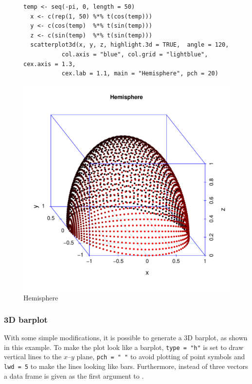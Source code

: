 \vspace*{10mm}
\begin{figure}[htb!]
\small
\begin{Verbatim}[frame=single]
  temp <- seq(-pi, 0, length = 50)
  x <- c(rep(1, 50) %*% t(cos(temp)))
  y <- c(cos(temp)  %*% t(sin(temp)))
  z <- c(sin(temp)  %*% t(sin(temp)))
  scatterplot3d(x, y, z, highlight.3d = TRUE,  angle = 120,
           col.axis = "blue", col.grid = "lightblue", cex.axis = 1.3,
           cex.lab = 1.1, main = "Hemisphere", pch = 20)
\end{Verbatim}
\normalsize
\begin{center}
\includegraphics[width=13cm]{hemisphere}
\end{center}
\vspace*{-10mm}\caption{Hemisphere\label{hemisphere}}
\end{figure}


\clearpage\subsubsection{3D barplot}
With some simple modifications, it is possible to generate a 3D barplot, as shown in this example.
To make the plot look like a barplot, {\tt type = "h"} is set to draw vertical lines to the $x$--$y$ plane,
{\tt pch = " "} to avoid plotting of point symbols and {\tt lwd = 5} to make the lines looking like bars.
Furthermore, instead of three vectors a data frame is given as the first argument to \sdd .

